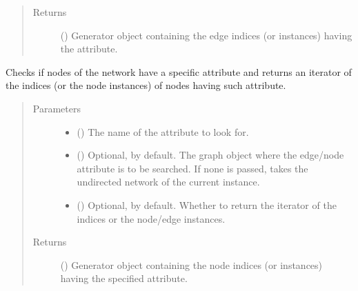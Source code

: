 \documentclass[letterpaper,10pt,english]{sphinxmanual}
\begin{document}
\begin{fulllineitems}
\begin{fulllineitems}
\begin{quote}
\begin{description}
\begin{itemize}
\end{itemize}

\item[{Returns}] \leavevmode
() \textendash{} Generator object containing the edge
indices (or instances) having the  attribute.

\end{description}\end{quote}

\end{fulllineitems}


\begin{fulllineitems}
\label{\detokenize{main:pypath.main.PyPath.having_vattr}}
Checks if nodes of the network have a specific attribute and
returns an iterator of the indices (or the node instances) of
nodes having such attribute.
\begin{quote}\begin{description}
\item[{Parameters}] \leavevmode\begin{itemize}
\item {} 
 () \textendash{} The name of the attribute to look for.

\item {} 
 () \textendash{} Optional,  by default. The graph object where the
edge/node attribute is to be searched. If none is passed,
takes the undirected network of the current instance.

\item {} 
 () \textendash{} Optional,  by default. Whether to return the
iterator of the indices or the node/edge instances.

\end{itemize}

\item[{Returns}] \leavevmode
() \textendash{} Generator object containing the node
indices (or instances) having the specified attribute.


\end{description}
\end{quote}
\end{fulllineitems}
\end{fulllineitems}
\end{document}
